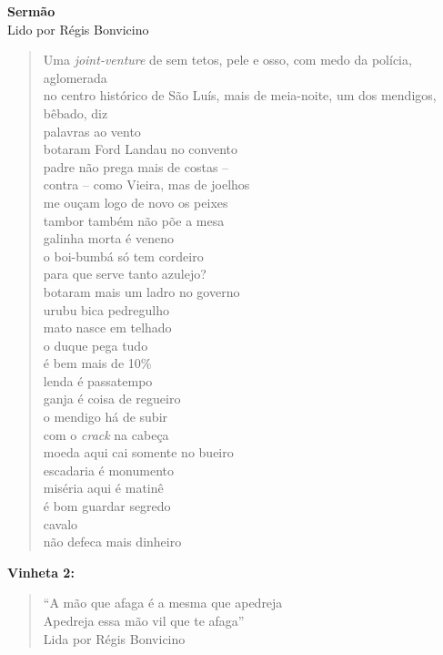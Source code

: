 \pagebreak

\textbf{Sermão}\\
Lido por Régis Bonvicino

\begin{verse}
Uma \emph{joint-venture} de sem tetos, pele e osso, com medo da polícia, aglomerada\\
no centro histórico de São Luís, mais de meia-noite, um dos mendigos, bêbado, diz\\[15pt]
palavras ao vento\\
botaram Ford Landau no convento\\
padre não prega mais de costas --\\
contra -- como Vieira, mas de joelhos\\[5pt]
me ouçam logo de novo os peixes\\
tambor também não põe a mesa\\
galinha morta é veneno\\
o boi-bumbá só tem cordeiro\\[5pt]
para que serve tanto azulejo?\\
botaram mais um ladro no governo\\
urubu bica pedregulho\\
mato nasce em telhado\\[5pt]
o duque pega tudo\\
é bem mais de 10\%\\
lenda é passatempo\\
ganja é coisa de regueiro\\[5pt]
o mendigo há de subir\\
com o \emph{crack} na cabeça\\
moeda aqui cai somente no bueiro\\
escadaria é monumento\\[5pt]
miséria aqui é matinê\\
é bom guardar segredo\\
cavalo\\
não defeca mais dinheiro
\end{verse}

\pagebreak

\textbf{Vinheta 2:}

\begin{verse}
``A mão que afaga é a mesma que apedreja\\
Apedreja essa mão vil que te afaga''\\[5pt]
Lida por Régis Bonvicino
\end{verse}

